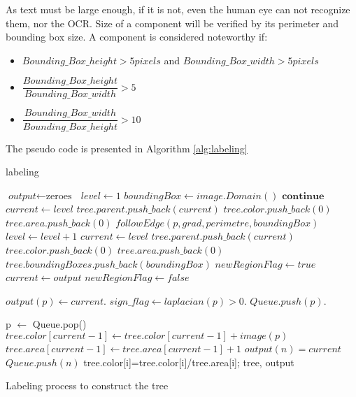 \par 
As text must be large enough, if it is not, even the human eye can not recognize them, nor the OCR. Size of a component will be verified by its perimeter and bounding box size. A component is considered noteworthy if:
\begin{itemize} 
	\item $Bounding\_Box\_height >5 pixels $ and $Bounding\_Box\_width>5 pixels $
	\item $\dfrac{Bounding\_Box\_height}{Bounding\_Box\_width} >5 $  
	\item $\dfrac{Bounding\_Box\_width}{Bounding\_Box\_height} >10 $	
\end{itemize}
\par
The pseudo code is presented in Algorithm \ref{alg:labeling}

\begin{algorithm}
\caption{labeling}\label{alg:labeling}
\begin{algorithmic}[1]
\State $\textit{output} \gets \text{zeroes }$
\State $ level \gets 1$
\State $ boundingBox \gets image.Domain()$
 $\textbf{continue}$
\EndIf
{}
	\State $current \gets level$
	\State $tree.parent.push\_back(current)$
	\State $tree.color.push\_back(0)$
	\State $tree.area.push\_back(0)$
\Else
	\State $followEdge(p,grad,perimetre,boundingBox)$
		\State $ level \gets level+1$
		\State $ current \gets level$
		\State $tree.parent.push\_back(current)$
		\State $tree.color.push\_back(0)$
		\State $tree.area.push\_back(0)$
		\State $tree.boundingBoxes.push\_back(boundingBox)$		
		\State $newRegionFlag \gets true$		
	\Else
		\State $current \gets output$
		\State $newRegionFlag \gets false$
	\EndIf
\EndIf

\State $output(p) \gets current $.
\State $sign\_flag \gets laplacian(p)>0$.
\State $Queue.push(p)$.

	\State p $\gets$ Queue.pop()
	\State $tree.color[current-1] \gets tree.color[current-1] + image(p) $
	\State $tree.area[current-1] \gets tree.area[current-1] + 1$
			\State $output(n) = current$
			\State $Queue.push(n)$
		\EndIf			
	\EndFor
\EndWhile
\EndFor
{}
	\State tree.color[i]=tree.color[i]/tree.area[i];
\EndFor
\State \Return tree, output
\EndProcedure
\end{algorithmic}
\caption{Labeling process to construct the tree}
\end{algorithm}

